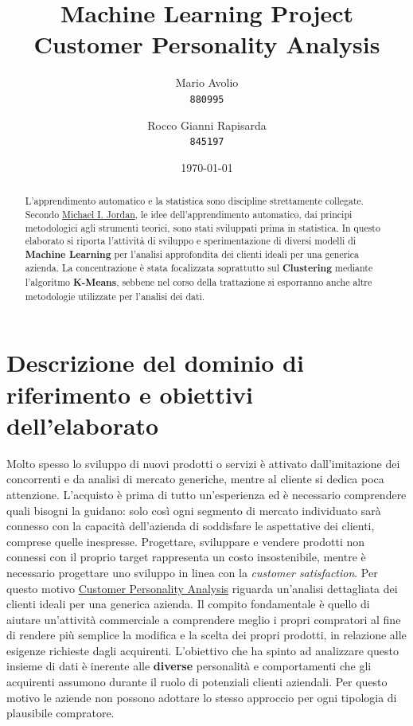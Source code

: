 \documentclass[letterpaper,11pt]{article}
\begin{document}
\title{Machine Learning Project \\\textbf{Customer Personality Analysis}}

\author{
  Mario Avolio\\
  \texttt{880995}
  \and
  Rocco Gianni Rapisarda\\
  \texttt{845197}
}
\date{\today}
\maketitle

\begin{abstract}
L'apprendimento automatico e la statistica sono discipline strettamente collegate. Secondo \href{https://en.wikipedia.org/wiki/Michael\_I.\_Jordan}{Michael I. Jordan}, le idee dell'apprendimento automatico, dai principi metodologici agli strumenti teorici, sono stati sviluppati prima in statistica. In questo elaborato si riporta l'attività di sviluppo e sperimentazione di diversi modelli di \textbf{Machine Learning} per l'analisi approfondita dei clienti ideali per una generica azienda. La concentrazione è stata focalizzata soprattutto sul \textbf{Clustering} mediante l'algoritmo \textbf{K-Means}, sebbene nel corso della trattazione si esporranno anche altre metodologie utilizzate per l'analisi dei dati.
\end{abstract}

\section{Descrizione del dominio di riferimento e obiettivi dell’elaborato}
Molto spesso lo sviluppo di nuovi prodotti o servizi è attivato dall’imitazione dei concorrenti e da analisi di mercato generiche, mentre al cliente si dedica poca attenzione. L’acquisto è prima di tutto un’esperienza ed è necessario comprendere quali bisogni la guidano: solo così ogni segmento di mercato individuato sarà connesso con la capacità dell’azienda di soddisfare le aspettative dei clienti, comprese quelle inespresse. Progettare, sviluppare e vendere prodotti non connessi con il proprio target rappresenta un costo insostenibile, mentre è necessario progettare uno sviluppo in linea con la \textit{customer satisfaction}. Per questo motivo \href{https://github.com/MarioAvolio/Customer-Personality-Analysis-with-R}{Customer Personality Analysis} riguarda un'analisi dettagliata dei clienti ideali per una generica azienda. Il compito fondamentale è quello di aiutare un'attività commerciale a comprendere meglio i propri compratori al fine di rendere più semplice la modifica e la scelta dei propri prodotti, in relazione alle esigenze richieste dagli acquirenti. L'obiettivo che ha spinto ad analizzare questo insieme di dati è inerente alle \textbf{diverse} personalità e comportamenti che gli acquirenti assumono durante il ruolo di potenziali clienti aziendali. Per questo motivo le aziende non possono adottare lo stesso approccio per ogni tipologia di plausibile compratore. 
\end{document}
